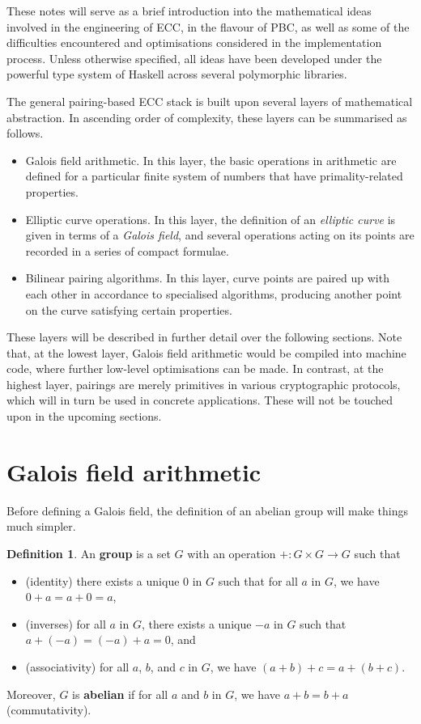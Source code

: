 \documentclass{article}
\theoremstyle{definition}
\newtheorem{definition}{Definition}
\begin{document}
These notes will serve as a brief introduction into the mathematical ideas involved in the engineering of ECC, in the flavour of PBC, as well as some of the difficulties encountered and optimisations considered in the implementation process. Unless otherwise specified, all ideas have been developed under the powerful type system of Haskell across several polymorphic libraries.

The general pairing-based ECC stack is built upon several layers of mathematical abstraction. In ascending order of complexity, these layers can be summarised as follows.
\begin{itemize}
\item Galois field arithmetic. In this layer, the basic operations in arithmetic are defined for a particular finite system of numbers that have primality-related properties.
\item Elliptic curve operations. In this layer, the definition of an \emph{elliptic curve} is given in terms of a \emph{Galois field}, and several operations acting on its points are recorded in a series of compact formulae.
\item Bilinear pairing algorithms. In this layer, curve points are paired up with each other in accordance to specialised algorithms, producing another point on the curve satisfying certain properties.
\end{itemize}
These layers will be described in further detail over the following sections. Note that, at the lowest layer, Galois field arithmetic would be compiled into machine code, where further low-level optimisations can be made. In contrast, at the highest layer, pairings are merely primitives in various cryptographic protocols, which will in turn be used in concrete applications. These will not be touched upon in the upcoming sections.

\pagebreak

\section{Galois field arithmetic}

Before defining a Galois field, the definition of an abelian group will make things much simpler.

\begin{definition}
An \textbf{group} is a set $ G $ with an operation $ + : G \times G \to G $ such that
\begin{itemize}
\item (identity) there exists a unique $ 0 $ in $ G $ such that for all $ a $ in $ G $, we have $ 0 + a = a + 0 = a $,
\item (inverses) for all $ a $ in $ G $, there exists a unique $ -a $ in $ G $ such that $ a + (-a) = (-a) + a = 0 $, and
\item (associativity) for all $ a $, $ b $, and $ c $ in $ G $, we have $ (a + b) + c = a + (b + c) $.
\end{itemize}
Moreover, $ G $ is \textbf{abelian} if for all $ a $ and $ b $ in $ G $, we have $ a + b = b + a $ (commutativity).
\end{definition}
\end{document}
